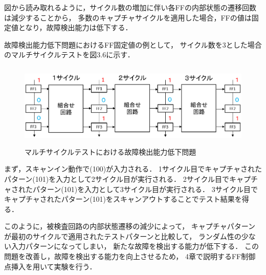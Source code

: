 図から読み取れるように，サイクル数の増加に伴い各FFの内部状態の遷移回数は減少することから，
多数のキャプチャサイクルを適用した場合，FFの値は固定値となり，故障検出能力は低下する．

故障検出能力低下問題におけるFF固定値の例として，
サイクル数を3とした場合のマルチサイクルテストを図3.6に示す．

\begin{figure}[h]
	\begin{center}
		\includegraphics[height=40mm]{trandem.eps}
		\caption{マルチサイクルテストにおける故障検出能力低下問題}
	\end{center}
\end{figure}

まず，スキャンイン動作で(100)が入力される．
1サイクル目でキャプチャされたパターン(101)を入力として2サイクル目が実行される．
2サイクル目でキャプチャされたパターン(101)を入力として3サイクル目が実行される．
3サイクル目でキャプチャされたパターン(101)をスキャンアウトすることでテスト結果を得る．

このように，被検査回路の内部状態遷移の減少によって，
キャプチャパターンが最初のサイクルで適用されたテストパターンと比較して，
ランダム性の少ない入力パターンになってしまい，
新たな故障を検出する能力が低下する．
この問題を改善し，故障を検出する能力を向上させるため，
4章で説明するFF制御点挿入を用いて実験を行う．